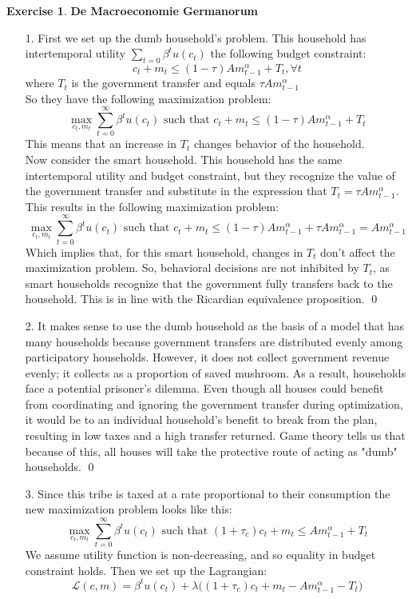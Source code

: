 \documentclass[12pt]{article}
\theoremstyle{definition}
\newtheorem{exercise}[theorem]{Exercise}
\newcommand{\V}{\vspace{0.3cm}\\}
\begin{document}
\begin{exercise} \textbf{De Macroeconomie Germanorum}
\begin{enumerate}
    \item [1.] First we set up the dumb household's problem. This household has intertemporal utility $\sum_{t=0} \beta^t u(c_t)$ the following budget constraint: $$c_t + m_t \leq (1-\tau)Am_{t-1}^\alpha + T_t, \forall t$$
    where $T_t$ is the government transfer and equals $\tau Am_{t-1}^\alpha$ \V
    So they have the following maximization problem: $$\max_{c_t, m_t} \sum_{t=0}^\infty \beta^t u(c_t) \text{ such that } c_t + m_t \leq (1-\tau)Am_{t-1}^\alpha + T_t$$
    This means that an increase in $T_t$ changes behavior of the household. \V
    Now consider the smart household. This household has the same intertemporal utility and budget constraint, but they recognize the value of the government transfer and substitute in the expression that $T_t = \tau Am_{t-1}^\alpha$. This results in the following maximization problem: $$\max_{c_t, m_t} \sum_{t=0}^\infty \beta^t u(c_t) \text{ such that } c_t + m_t \leq (1-\tau)Am_{t-1}^\alpha + \tau Am_{t-1}^\alpha = Am_{t-1}^\alpha$$
    Which implies that, for this smart household, changes in $T_t$ don't affect the maximization problem. So, behavioral decisions are not inhibited by $T_t$, as smart households recognize that the government fully transfers back to the household. This is in line with the Ricardian equivalence proposition. \qed
    \item [2.] It makes sense to use the dumb household as the basis of a model that has many households because government transfers are distributed evenly among participatory households. However, it does not collect government revenue evenly; it collects as a proportion of saved mushroom. As a result, households face a potential prisoner's dilemma. Even though all houses could benefit from coordinating and ignoring the government transfer during optimization, it would be to an individual household's benefit to break from the plan, resulting in low taxes and a high transfer returned. Game theory tells us that because of this, all houses will take the protective route of acting as "dumb" households. \qed 
    \item [3.]  Since this tribe is taxed at a rate proportional to their consumption the new maximization problem looks like this: $$\max_{c_t,m_t} \sum_{t=0}^\infty \beta^t u(c_t) \text{ such that } (1+\tau_c)c_t + m_t \leq Am_{t-1}^\alpha + T_t$$
    We assume utility function is non-decreasing, and so equality in budget constraint holds. Then we set up the Lagrangian: $$\mathscr{L}(c, m) = \beta^t u(c_t) + \lambda\big((1+\tau_c)c_t + m_t - Am_{t-1}^\alpha - T_t \big) $$

\end{enumerate}
\end{exercise}
\end{document}
